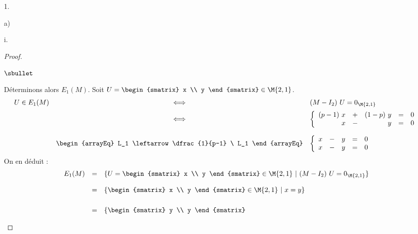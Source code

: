 \documentclass[11pt]{article}%
\begin{document}
\begin{noliste}{1.}
\begin{noliste}{a)}
\begin{nonoliste}{i.}
\begin{proof}
\begin{noliste}{$\sbullet$}
        \item Déterminons alors $E_{1}(M)$. Soit $U =
          \begin{smatrix}
            x \\
            y 
          \end{smatrix}
          \in \M{2,1}
          $.
          \[
          \begin{array}{rcl}
            U \in E_{1}(M) & \Longleftrightarrow & (M - I_2) \ U = 0_{\M{2,1}}
            \\[.2cm]
            & \Longleftrightarrow & 
            \left\{
              \begin{array}{rcrcc}
                (p-1) \ x & + & (1-p) \ y & = & 0 \\
                x & - & y & = & 0 
              \end{array}
            \right. %
            \\[.6cm]
            &
            \begin{arrayEq}
              L_1 \leftarrow \dfrac{1}{p-1} \ L_1
            \end{arrayEq}
            & 
            \left\{
              \begin{array}{rcrcc}
                x & - & y & = & 0 \\
                x & - & y & = & 0 
              \end{array}
            \right. %
          \end{array}
          \]
          On en déduit :
          \[
          \begin{array}{rcl}
            E_1(M) & = & \{U =
            \begin{smatrix}
              x \\
              y 
            \end{smatrix}
            \in \M{2,1}
            \ | \ 
            (M - I_2) \ U = 0_{\M{2,1}}
            \}
            \\[.4cm]
            & = & \{
            \begin{smatrix}
              x \\
              y 
            \end{smatrix}
            \in \M{2,1}        
            \ | \ 
            x = y
            \}
            \\[.6cm]
            & = & \{
            \begin{smatrix}
              y \\
              y 
            \end{smatrix}

\end{array}\]
\end{noliste}
\end{proof}
\end{nonoliste}
\end{noliste}
\end{noliste}
\end{document}
